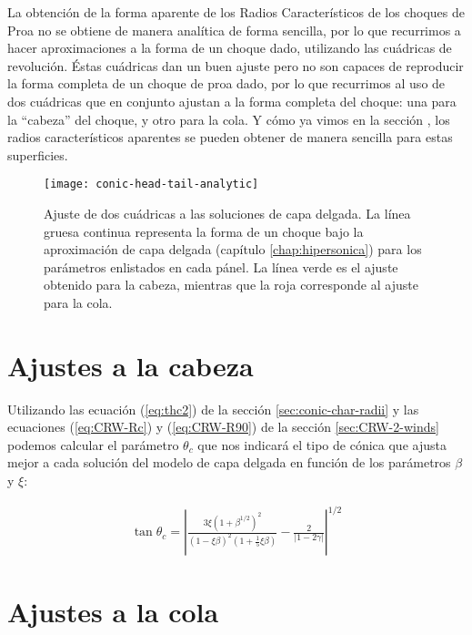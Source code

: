 La obtención de la forma aparente de los Radios Característicos de los choques de Proa
no se obtiene de manera analítica de forma sencilla, por lo que recurrimos a hacer
aproximaciones a la forma de un choque dado, utilizando las cuádricas de revolución.
Éstas cuádricas dan un buen ajuste pero no son capaces de reproducir la forma completa
de un choque de proa dado, por lo que recurrimos al uso de dos cuádricas que en conjunto
ajustan a la forma completa del choque: una para la ``cabeza'' del choque, y otro para la cola.
Y cómo ya vimos en la sección , los radios característicos aparentes se pueden obtener de
manera sencilla para estas superficies.

\begin{figure*}
  \texttt{[image: conic-head-tail-analytic]}
  \label{fig:conic-head-tail-fit}
  \caption{Ajuste de dos cuádricas a las soluciones de capa delgada. La línea gruesa continua
    representa la forma de un choque bajo la aproximación de capa delgada (capítulo
    \ref{chap:hipersonica}) para los parámetros enlistados en cada pánel. La línea verde es el
    ajuste obtenido para la cabeza, mientras que la roja corresponde al ajuste para la cola.}
\end{figure*}


\section{Ajustes a la cabeza}

Utilizando las ecuación (\ref{eq:thc2})  de la sección \ref{sec:conic-char-radii} y las ecuaciones
(\ref{eq:CRW-Rc}) y (\ref{eq:CRW-R90}) de la sección \ref{sec:CRW-2-winds} podemos calcular el parámetro
$\theta_c$ que nos indicará el tipo de cónica que ajusta mejor a cada solución del modelo de capa delgada
en función de los parámetros
 $\beta$ y $\xi$:

 \begin{align}
   \tan\theta_c = \left|\frac{3\xi\left(1 + \beta^{1/2}\right)^2}{\left(1 - \xi\beta\right)^2
   \left(1 + \frac{1}{5}\xi\beta\right)} - \frac{2}{\left|1 - 2\gamma\right|}\right|^{1/2}
 \end{align}

 
 
\section{Ajustes a la cola}